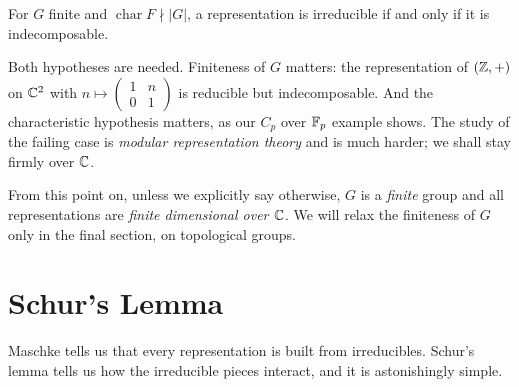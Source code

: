 \documentclass[a4paper]{scrartcl}
\begin{document}
\begin{corollary}
	For $G$ finite and $\operatorname{char} F \nmid |G|$, a representation is irreducible if and only if it is indecomposable.
\end{corollary}

\begin{remark}
	Both hypotheses are needed. Finiteness of $G$ matters: the representation of $(\mathbb{Z},+)$ on $\mathbb{C}^2$ with $n \mapsto \left(\begin{smallmatrix}1 & n\\ 0&1\end{smallmatrix}\right)$ is reducible but indecomposable. And the characteristic hypothesis matters, as our $C_p$ over $\mathbb{F}_p$ example shows. The study of the failing case is \emph{modular representation theory} and is much harder; we shall stay firmly over $\mathbb{C}$.
\end{remark}

\begin{remark}
	From this point on, unless we explicitly say otherwise, $G$ is a \emph{finite} group and all representations are \emph{finite dimensional over $\mathbb{C}$}. We will relax the finiteness of $G$ only in the final section, on topological groups.
\end{remark}

\section{Schur's Lemma}

Maschke tells us that every representation is built from irreducibles. Schur's lemma tells us how the irreducible pieces interact, and it is astonishingly simple.
\end{document}
